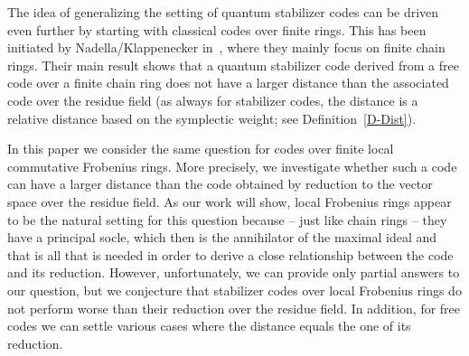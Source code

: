 \documentclass[11pt]{article}
\theoremstyle{definition}
\numberwithin{equation}{section}
\newcounter{rom}
\begin{document}
The idea of generalizing the setting of quantum stabilizer codes can be driven even further by starting with classical codes over finite rings.
This has been initiated by Nadella/Klappenecker in~\cite{NaKl12}, where they mainly focus on finite chain rings.
Their main result shows that a quantum stabilizer code derived from a free code over a finite chain ring does not have a larger distance than the
associated code over the residue field (as always for stabilizer codes, the distance is a relative distance based on the symplectic weight; see Definition~\ref{D-Dist}).

In this paper we consider the same question for codes over finite local commutative Frobenius rings.
More precisely, we investigate whether such a code can have a larger distance than the code obtained by reduction to the vector space over the residue field.
As our work will show, local Frobenius rings appear to be the natural setting for this question because -- just like chain rings -- they have a principal socle, which
then is the annihilator of the maximal ideal and that is all that is needed in order to derive a close relationship between the code and its reduction.
However, unfortunately, we can provide only partial answers to our question, but we conjecture that stabilizer codes over local Frobenius rings do not perform
worse than their reduction over the residue field.
In addition, for free codes we can settle various cases where the distance equals the one of its reduction.
\end{document}
